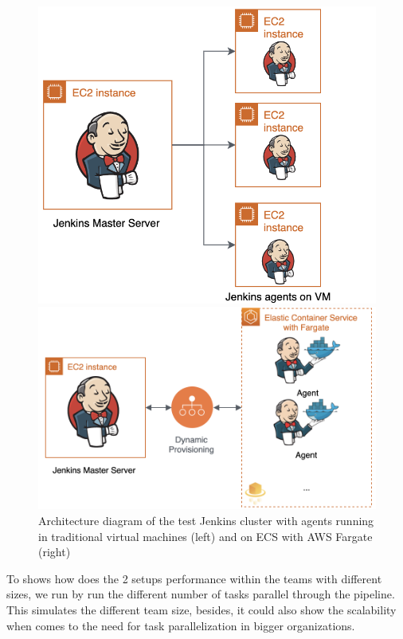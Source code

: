 \begin{figure}[h]
    \centering
    \begin{minipage}{0.45\textwidth}
        \centering
        \includegraphics[width=\textwidth]{pics/jenkins-on-vm.png} %
    \end{minipage}\hfill
    \begin{minipage}{0.54\textwidth}
        \centering
        \includegraphics[width=\textwidth]{pics/jenkins-on-fargate.png} %
    \end{minipage}
    \label{fig:ex1}
    \caption{Architecture diagram of the test Jenkins cluster with agents running in traditional virtual machines (left) and on ECS with AWS Fargate (right)}
\end{figure}
\par
To shows how does the 2 setups performance within the teams with different sizes, we run by run the different number of tasks parallel through the pipeline. This simulates the different team size, besides, it could also show the scalability when comes to the need for task parallelization in bigger organizations.

